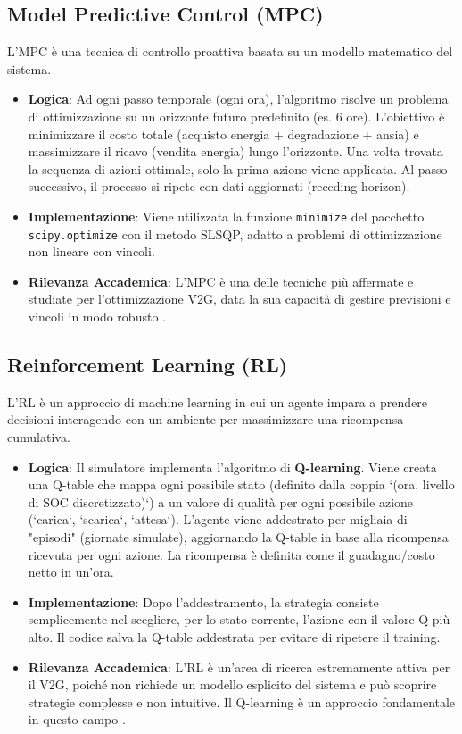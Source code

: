 \documentclass[a4paper, 11pt]{article}
\begin{document}
\subsection{Model Predictive Control (MPC)}
L'MPC è una tecnica di controllo proattiva basata su un modello matematico del sistema.
\begin{itemize}
    \item \textbf{Logica}: Ad ogni passo temporale (ogni ora), l'algoritmo risolve un problema di ottimizzazione su un orizzonte futuro predefinito (es. 6 ore). L'obiettivo è minimizzare il costo totale (acquisto energia + degradazione + ansia) e massimizzare il ricavo (vendita energia) lungo l'orizzonte. Una volta trovata la sequenza di azioni ottimale, solo la prima azione viene applicata. Al passo successivo, il processo si ripete con dati aggiornati (receding horizon).
    \item \textbf{Implementazione}: Viene utilizzata la funzione \texttt{minimize} del pacchetto \texttt{scipy.optimize} con il metodo SLSQP, adatto a problemi di ottimizzazione non lineare con vincoli.
    \item \textbf{Rilevanza Accademica}: L'MPC è una delle tecniche più affermate e studiate per l'ottimizzazione V2G, data la sua capacità di gestire previsioni e vincoli in modo robusto \cite{Nunna2018}.
\end{itemize}

\subsection{Reinforcement Learning (RL)}
L'RL è un approccio di machine learning in cui un agente impara a prendere decisioni interagendo con un ambiente per massimizzare una ricompensa cumulativa.
\begin{itemize}
    \item \textbf{Logica}: Il simulatore implementa l'algoritmo di \textbf{Q-learning}. Viene creata una Q-table che mappa ogni possibile stato (definito dalla coppia `(ora, livello di SOC discretizzato)`) a un valore di qualità per ogni possibile azione (`carica`, `scarica`, `attesa`). L'agente viene addestrato per migliaia di "episodi" (giornate simulate), aggiornando la Q-table in base alla ricompensa ricevuta per ogni azione. La ricompensa è definita come il guadagno/costo netto in un'ora.
    \item \textbf{Implementazione}: Dopo l'addestramento, la strategia consiste semplicemente nel scegliere, per lo stato corrente, l'azione con il valore Q più alto. Il codice salva la Q-table addestrata per evitare di ripetere il training.
    \item \textbf{Rilevanza Accademica}: L'RL è un'area di ricerca estremamente attiva per il V2G, poiché non richiede un modello esplicito del sistema e può scoprire strategie complesse e non intuitive. Il Q-learning è un approccio fondamentale in questo campo \cite{Pazouki2021}.
\end{itemize}
\end{document}
